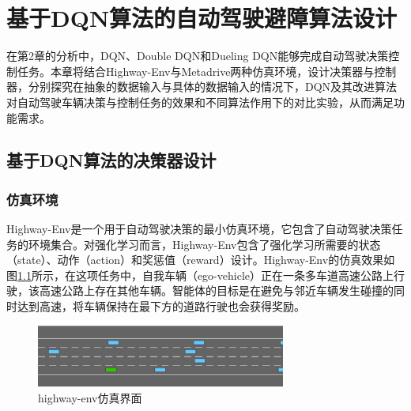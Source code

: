 %
%
%
%
%

\chapter{基于DQN算法的自动驾驶避障算法设计}

在第2章的分析中，DQN、Double DQN和Dueling DQN能够完成自动驾驶决策控制任务。本章将结合Highway-Env与Metadrive两种仿真环境，设计决策器与控制器，分别探究在抽象的数据输入与具体的数据输入的情况下，DQN及其改进算法对自动驾驶车辆决策与控制任务的效果和不同算法作用下的对比实验，从而满足功能需求。

\section{基于DQN算法的决策器设计}\label{3.1基于DQN算法的决策器设计} %

\subsection{仿真环境}\label{3.1.1仿真环境}

Highway-Env是一个用于自动驾驶决策的最小仿真环境\cite{highway-env}，它包含了自动驾驶决策任务的环境集合。对强化学习而言，Highway-Env包含了强化学习所需要的状态（state）、动作（action）和奖惩值（reward）设计。Highway-Env的仿真效果如图\ref{highway-env}所示，在这项任务中，自我车辆（ego-vehicle）正在一条多车道高速公路上行驶，该高速公路上存在其他车辆。智能体的目标是在避免与邻近车辆发生碰撞的同时达到高速，将车辆保持在最下方的道路行驶也会获得奖励。

\begin{figure}[htbp]
    \vspace{13pt}
    \centering
    \includegraphics[width=0.73\textwidth]{images/chapter3/highway-env.png}
    \caption{highway-env仿真界面}\label{highway-env} %
\end{figure}  

